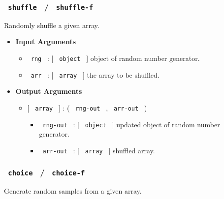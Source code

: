 \subsubsection{\texorpdfstring{\texttt{\ shuffle\ } /
\texttt{\ shuffle-f\ }}{ shuffle  /  shuffle-f }}\label{shuffle-shuffle-f}

Randomly shuffle a given array.

\begin{Shaded}
\begin{Highlighting}[]
\end{Highlighting}
\end{Shaded}

\begin{itemize}
\item
  \textbf{Input Arguments}

  \begin{itemize}
  \tightlist
  \item
    \texttt{\ rng\ } : {[} \texttt{\ object\ } {]} object of random
    number generator.
  \item
    \texttt{\ arr\ } : {[} \texttt{\ array\ } {]} the array to be
    shuffled.
  \end{itemize}
\item
  \textbf{Output Arguments}

  \begin{itemize}
  \tightlist
  \item
    {[} \texttt{\ array\ } {]} : ( \texttt{\ rng-out\ } ,
    \texttt{\ arr-out\ } )

    \begin{itemize}
    \tightlist
    \item
      \texttt{\ rng-out\ } : {[} \texttt{\ object\ } {]} updated object
      of random number generator.
    \item
      \texttt{\ arr-out\ } : {[} \texttt{\ array\ } {]} shuffled array.
    \end{itemize}
  \end{itemize}
\end{itemize}

\subsubsection{\texorpdfstring{\texttt{\ choice\ } /
\texttt{\ choice-f\ }}{ choice  /  choice-f }}\label{choice-choice-f}

Generate random samples from a given array.

